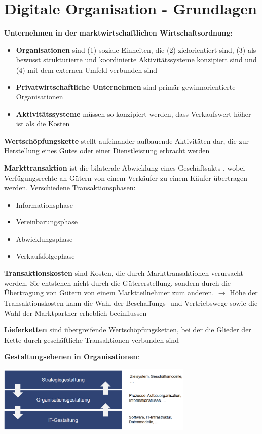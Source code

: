 \section{Digitale Organisation - Grundlagen}
\textbf{Unternehmen in der marktwirtschaftlichen Wirtschaftsordnung}:
\begin{itemize}
	\item \textbf{Organisationen} sind (1) soziale Einheiten, die (2) zielorientiert sind, (3) als bewusst strukturierte und koordinierte Aktivitätssysteme konzipiert sind und (4) mit dem externen Umfeld verbunden sind
	\item \textbf{Privatwirtschaftliche Unternehmen} sind primär gewinnorientierte Organisationen
	\item \textbf{Aktivitätssysteme} müssen so konzipiert werden, dass Verkaufswert höher ist als die Kosten
\end{itemize}

\textbf{Wertschöpfungskette} stellt aufeinander aufbauende Aktivitäten dar, die zur Herstellung eines Gutes oder
einer Dienstleistung erbracht werden

\textbf{Markttransaktion} ist die bilaterale Abwicklung eines Geschäftsakts , wobei Verfügungsrechte an
Gütern von einem Verkäufer zu einem Käufer übertragen werden. Verschiedene Transaktionsphasen:
\begin{itemize}
	\item Informationsphase
	\item Vereinbarungsphase
	\item Abwicklungsphase
	\item Verkaufsfolgephase
\end{itemize}

\textbf{Transaktionskosten} sind Kosten, die durch Markttransaktionen verursacht werden. Sie entstehen nicht durch die Gütererstellung, sondern durch die Übertragung von Gütern von einem Marktteilnehmer zum anderen. $\rightarrow$ Höhe der Transaktionskosten kann die Wahl der Beschaffungs- und Vertriebswege sowie die Wahl der Marktpartner erheblich beeinflussen

\textbf{Lieferketten} sind übergreifende Wertschöpfungsketten, bei der die Glieder der Kette  durch geschäftliche Transaktionen verbunden sind

\textbf{Gestaltungsebenen in Organisationen}:
\begin{center}
	\includegraphics[width=0.7\textwidth]{images/gestaltungsebenen.png}
\end{center}


